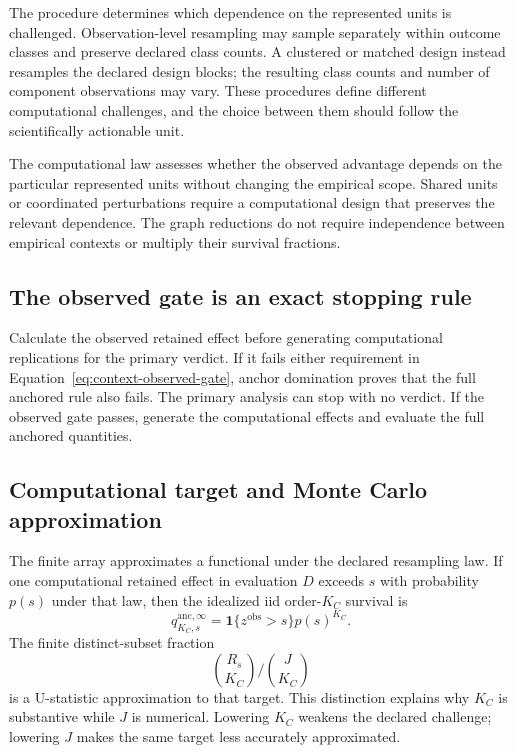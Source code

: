 \documentclass[11pt]{article}
\theoremstyle{remark}
\begin{document}
The procedure determines which dependence on the represented units is
challenged. Observation-level resampling may sample separately within outcome
classes and preserve declared class counts. A clustered or matched design
instead resamples the declared design blocks; the resulting class counts and
number of component observations may vary. These procedures define different
computational challenges, and the choice between them should follow the
scientifically actionable unit.

The computational law assesses whether the observed advantage depends on the
particular represented units without changing the empirical scope. Shared
units or coordinated perturbations require a computational design that
preserves the relevant dependence. The graph reductions do not require
independence between empirical contexts or multiply their survival fractions.

\subsection{The observed gate is an exact stopping rule}

Calculate the observed retained effect before generating computational
replications for the primary verdict. If it fails either requirement in
Equation~\eqref{eq:context-observed-gate}, anchor domination proves that the
full anchored rule also fails. The primary analysis can stop with no verdict.
If the observed gate passes, generate the computational effects and evaluate
the full anchored quantities.

\subsection{Computational target and Monte Carlo approximation}

The finite array approximates a functional under the declared resampling law.
If one computational retained effect in evaluation $D$ exceeds $s$ with probability
$p(s)$ under that law, then the idealized iid order-$K_C$ survival is
\begin{equation}
q^{\mathrm{anc},\infty}_{K_C,s}
=
\mathbf 1\{z^{\mathrm{obs}}>s\}p(s)^{K_C}.
\label{eq:context-ideal-survival}
\end{equation}
The finite distinct-subset fraction
\[
\binom{R_s}{K_C}/\binom{J}{K_C}
\]
is a U-statistic approximation to that target. This distinction explains
why $K_C$ is substantive while $J$ is numerical. Lowering $K_C$ weakens the
declared challenge; lowering $J$ makes the same target less accurately
approximated.
\end{document}
